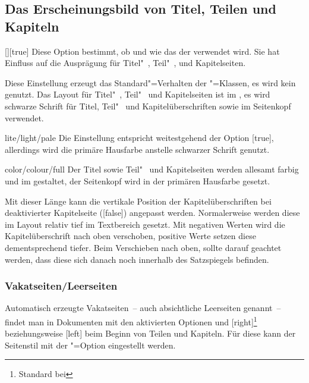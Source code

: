 \documentclass[%
  english,ngerman,%
  headings=optiontoheadandtoc,captions=tableheading,numbers=noenddot,%
  chapterpage,cdfoot,%
]{tudscrman}
\begin{document}
\subsection{Das Erscheinungsbild von Titel, Teilen und Kapiteln}
\begin{Declaration}{[\PSet]}[true]
\printdeclarationlist%
%
%
Diese Option bestimmt, ob und wie das \CD der \TnUD verwendet wird. Sie hat
Einfluss auf die Ausprägung für Titel"~, Teil"~, und Kapitelseiten.
%
\begin{values}
\itemfalse
  Diese Einstellung erzeugt das Standard"=Verhalten der \KOMAScript"=Klassen, 
  es wird kein \CD genutzt.
  Das Layout für Titel"~, Teil"~ und Kapitelseiten ist im \CD, es wird 
  schwarze Schrift für Titel, Teil"~ und Kapitelüberschriften sowie im 
  Seitenkopf verwendet.
\item[lite/light/pale]
  Die Einstellung entspricht weitestgehend der Option [true], 
  allerdings wird die primäre Hausfarbe  anstelle schwarzer 
  Schrift genutzt.
\item[color/colour/full]
  Der Titel sowie Teil"~ und Kapitelseiten werden allesamt farbig und im \CD 
  gestaltet, der Seitenkopf wird in der primären Hausfarbe  gesetzt.
\end{values}
\end{Declaration}

\begin{Declaration}{}
\printdeclarationlist%
%
%
Mit dieser Länge kann die vertikale Position der Kapitelüberschriften bei 
deaktivierter Kapitelseite ([false]) angepasst werden. 
Normalerweise werden diese im Layout relativ tief im Textbereich gesetzt. Mit 
negativen Werten wird die Kapitelüberschrift nach oben verschoben, positive 
Werte setzen diese dementsprechend tiefer. Beim Verschieben nach oben, sollte 
darauf geachtet werden, dass diese sich danach noch innerhalb des Satzspiegels 
befinden.
\end{Declaration}

\subsubsection{Vakatseiten/Leerseiten}
%
Automatisch erzeugte Vakatseiten~-- auch absichtliche Leerseiten genannt~-- 
findet man in Dokumenten mit den aktivierten Optionen  und 
[right]\footnote{Standard bei } beziehungsweise 
[left] beim Beginn von Teilen und Kapiteln. Für diese kann der 
Seitenstil mit der \KOMAScript"=Option  eingestellt 
werden.
\end{document}
